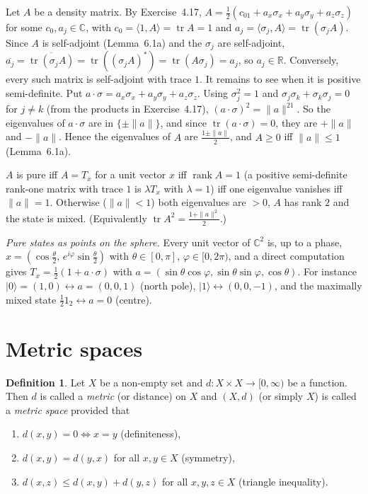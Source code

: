 \documentclass[11pt,a4paper]{article}
\numberwithin{equation}{section}
\newcommand{\R}{\mathbb{R}}
\newcommand{\C}{\mathbb{C}}
\newcommand{\ip}[2]{\langle #1, #2\rangle}
\newcommand{\ket}[1]{|#1\rangle}
\newcommand{\conj}[1]{\overline{#1}}
\DeclareMathOperator{\tr}{tr}
\DeclareMathOperator{\rank}{rank}
\theoremstyle{plain}
\theoremstyle{definition}
\newtheorem{definition}[theorem]{Definition}
\theoremstyle{plain}
\theoremstyle{definition}
\begin{document}
\begin{addition}
Let $A$ be a density matrix. By Exercise~4.17, $A=\frac12(c_01+a_x\sigma_x+a_y\sigma_y+a_z\sigma_z)$
for some $c_0,a_j\in\C$, with $c_0=\ip{1}{A}=\tr A=1$ and $a_j=\ip{\sigma_j}{A}=\tr(\sigma_jA)$.
Since $A$ is self-adjoint (Lemma~6.1a) and the $\sigma_j$ are self-adjoint,
$\conj{a_j}=\conj{\tr(\sigma_jA)}=\tr((\sigma_jA)^*)=\tr(A\sigma_j)=a_j$, so $a_j\in\R$.
Conversely, every such matrix is self-adjoint with trace $1$. It remains to see when it is
positive semi-definite. Put $a\cdot\sigma=a_x\sigma_x+a_y\sigma_y+a_z\sigma_z$. Using
$\sigma_j^2=1$ and $\sigma_j\sigma_k+\sigma_k\sigma_j=0$ for $j\ne k$ (from the products in
Exercise~4.17), $(a\cdot\sigma)^2=\|a\|^21$. So the eigenvalues of $a\cdot\sigma$ are in
$\{\pm\|a\|\}$, and since $\tr(a\cdot\sigma)=0$, they are $+\|a\|$ and $-\|a\|$. Hence
the eigenvalues of $A$ are $\frac{1\pm\|a\|}2$, and $A\ge0$ iff $\|a\|\le1$ (Lemma~6.1a).

$A$ is pure iff $A=T_x$ for a unit vector $x$ iff $\rank A=1$ (a positive semi-definite
rank-one matrix with trace $1$ is $\lambda T_x$ with $\lambda=1$) iff one eigenvalue
vanishes iff $\|a\|=1$. Otherwise ($\|a\|<1$) both eigenvalues are $>0$, $A$ has rank $2$
and the state is mixed. (Equivalently $\tr A^2=\frac{1+\|a\|^2}2$.)

\emph{Pure states as points on the sphere.} Every unit vector of $\C^2$ is, up to a phase,
$x=(\cos\frac\theta2,\,e^{i\varphi}\sin\frac\theta2)$ with $\theta\in[0,\pi]$,
$\varphi\in[0,2\pi)$, and a direct computation gives $T_x=\frac12(1+a\cdot\sigma)$ with
$a=(\sin\theta\cos\varphi,\sin\theta\sin\varphi,\cos\theta)$. For instance
$\ket0=(1,0)\leftrightarrow a=(0,0,1)$ (north pole), $\ket1\leftrightarrow(0,0,-1)$, and the
maximally mixed state $\frac121_2\leftrightarrow a=0$ (centre).
\end{addition}
\section{Metric spaces}

\begin{definition}
Let $X$ be a non-empty set and $d:X\times X\to[0,\infty)$ be a function. Then $d$ is
called a \emph{metric} (or distance) on $X$ and $(X,d)$ (or simply $X$) is called a
\emph{metric space} provided that
\begin{enumerate}
\item $d(x,y)=0\iff x=y$ (definiteness),
\item $d(x,y)=d(y,x)$ for all $x,y\in X$ (symmetry),
\item $d(x,z)\le d(x,y)+d(y,z)$ for all $x,y,z\in X$ (triangle inequality).
\end{enumerate}
\end{definition}
\end{document}
